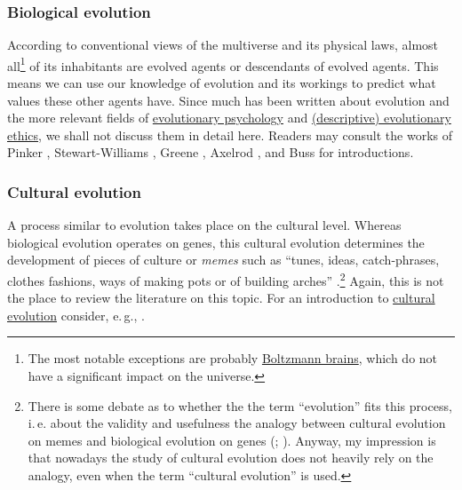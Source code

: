 \subsubsection{Biological evolution}\label{biological-evolution}

According to conventional views of the multiverse and its physical laws,
almost all\footnote{The most notable exceptions are probably
  \href{https://en.wikipedia.org/wiki/Boltzmann_brain}{Boltzmann
  brains}, which do not have a significant impact on the universe.} of
its inhabitants are evolved agents or descendants of evolved agents.
This means we can use our knowledge of evolution and its workings to
predict what values these other agents have. Since much has been written
about evolution and the more relevant fields of
\href{https://en.wikipedia.org/wiki/Evolutionary_psychology}{evolutionary
psychology} and
\href{https://en.wikipedia.org/wiki/Evolutionary_ethics\#Descriptive_evolutionary_ethics}{(descriptive)
evolutionary ethics}, we shall not discuss them in detail here. Readers
may consult the works of Pinker \citeyear{Pinker1999-dd},
Stewart-Williams \citeyear{Stewart-Williams2015-gg},
Greene \citeyear{Greene2013-sq},
Axelrod \citeyear{Axelrod2006-ci}, and
Buss \citeyear{Buss2015-kp} for introductions.

\subsubsection{Cultural evolution}\label{cultural-evolution}

A process similar to evolution takes place on the cultural level.
Whereas biological evolution operates on genes, this cultural evolution
determines the development of pieces of culture or \emph{memes} such as
``tunes, ideas, catch-phrases, clothes fashions, ways of making pots or
of building arches'' \parencite[chapter 11]{Dawkins1976-cd}.\footnote{There
  is some debate as to whether the the term ``evolution'' fits this
  process, i.\,e. about the validity and usefulness the analogy between
  cultural evolution on memes and biological evolution on genes
  (\cite{Edmonds2005-mi,Kuper_undated-zl,Gil-White2005-wt,Wimsatt1999-fy,Claidiere2012-gz,Atran2001-lb}; 
  \cite[chapter 3, section ``What now?'']{Pinker1999-dd}).
  Anyway, my impression is that nowadays the study of cultural evolution
  does not heavily rely on the analogy, even when the term ``cultural
  evolution'' is used.} Again, this is not the place to review the
literature on this topic. For an introduction to
\href{https://en.wikipedia.org/wiki/Cultural_evolution}{cultural
evolution} consider, e.\,g., \citet{Henrich2015-xe}.

